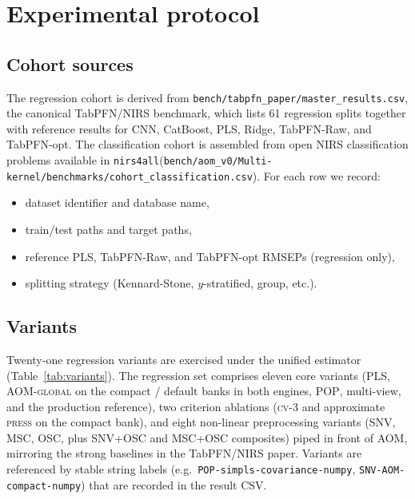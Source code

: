 \documentclass[review,a4paper]{elsarticle}
\newcommand{\AOM}{\textsc{AOM}\xspace}
\newcommand{\POP}{\textsc{POP}\xspace}
\newcommand{\PLS}{\textsc{PLS}\xspace}
\newcommand{\SNV}{\textsc{SNV}\xspace}
\newcommand{\MSC}{\textsc{MSC}\xspace}
\newcommand{\OSC}{\textsc{OSC}\xspace}
\newcommand{\nirsfourall}{\texttt{nirs4all}\xspace}
\begin{document}
\section{Experimental protocol}\label{sec:protocol}

\subsection{Cohort sources}
The regression cohort is derived from
\verb|bench/tabpfn_paper/master_results.csv|, the canonical TabPFN/NIRS
benchmark, which lists 61 regression splits together with reference
results for CNN, CatBoost, \PLS, Ridge, TabPFN-Raw, and TabPFN-opt. The
classification cohort is assembled from open NIRS classification
problems available in \nirsfourall (\verb|bench/aom_v0/Multi-kernel/benchmarks/cohort_classification.csv|).
For each row we record:
\begin{itemize}[leftmargin=2em]
  \item dataset identifier and database name,
  \item train/test paths and target paths,
  \item reference \PLS, TabPFN-Raw, and TabPFN-opt RMSEPs (regression only),
  \item splitting strategy (Kennard-Stone, $y$-stratified, group, etc.).
\end{itemize}

\subsection{Variants}
Twenty-one regression variants are exercised under the unified estimator
(Table~\ref{tab:variants}). The
regression set comprises eleven core variants (\PLS, \AOM-\textsc{global}
on the compact / default banks in both engines, \POP, multi-view, and
the production reference), two criterion ablations (\textsc{cv-3} and
approximate \textsc{press} on the compact bank), and eight non-linear
preprocessing variants (\SNV, \MSC, \OSC, plus \SNV+\OSC and \MSC+\OSC
composites) piped in front of \AOM, mirroring the strong baselines in
the TabPFN/NIRS paper.
Variants are referenced by stable string labels (e.g.\
\verb|POP-simpls-covariance-numpy|, \verb|SNV-AOM-compact-numpy|) that
are recorded in the result CSV.

\begin{table}[t]
\centering
\caption{Regression variants evaluated in the 57-split comparison.}
\label{tab:variants}
\resizebox{\linewidth}{!}{}
\end{table}
\end{document}

